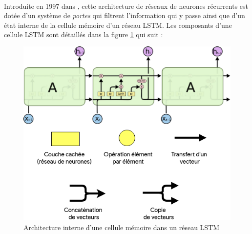 \paragraph{}
Introduite en 1997 dans \citep{lstm_original_paper}, cette architecture de réseaux de neurones récurrents est dotée d'un système de \textit{portes} qui filtrent l'information qui y passe ainsi que d'un état interne de la cellule mémoire d'un réseau LSTM. Les composants d'une cellule LSTM  sont détaillés dans la figure \ref{lstm_architecture} qui suit : 
\begin{figure}[H]
	\centering
	\includegraphics[width=0.5\linewidth]{images/notions/lstm_arch.png}
	\caption{Architecture interne d'une cellule mémoire dans un réseau LSTM \citep{rnns_online}}
	\label{lstm_architecture}
\end{figure}

